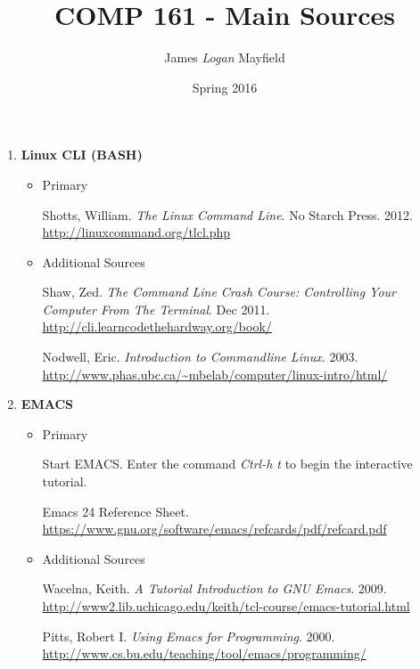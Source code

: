 \documentclass[10pt]{article}
\title{COMP 161 - Main Sources}
\author{ James \textit{Logan} Mayfield }
\date{Spring 2016}
\begin{document}
\maketitle

\begin{enumerate}
\item \textbf{Linux CLI (BASH)}
\begin{itemize}
\item Primary 

Shotts, William. \textit{The Linux Command Line}. No Starch Press. 2012. 
\newline \url{http://linuxcommand.org/tlcl.php}

\vspace{.25in}

\item Additional Sources

Shaw, Zed. \textit{The Command Line Crash Course: Controlling Your Computer From The Terminal}. Dec 2011. 
\newline \url{http://cli.learncodethehardway.org/book/}

\vspace{.25in}

Nodwell, Eric. \textit{Introduction to Commandline Linux}. 2003.
\newline \url{http://www.phas.ubc.ca/~mbelab/computer/linux-intro/html/}
\vspace{.25in}
\end{itemize}

\item \textbf{EMACS}
\begin{itemize}
\item Primary

Start EMACS. Enter the command \textit{Ctrl-h t} to begin the interactive tutorial.
\vspace{.25in}

Emacs 24 Reference Sheet. \newline
\url{https://www.gnu.org/software/emacs/refcards/pdf/refcard.pdf}	
\vspace{.25in}

\item Additional Sources

Wacelna, Keith. \textit{A Tutorial Introduction to GNU Emacs}. 2009.
\newline \url{http://www2.lib.uchicago.edu/keith/tcl-course/emacs-tutorial.html}
\vspace{.25in}

Pitts, Robert I. \textit{Using Emacs for Programming}. 2000. 
\newline \url{http://www.cs.bu.edu/teaching/tool/emacs/programming/} 
\vspace{.25in}


\end{itemize}
\end{enumerate}
\end{document}
